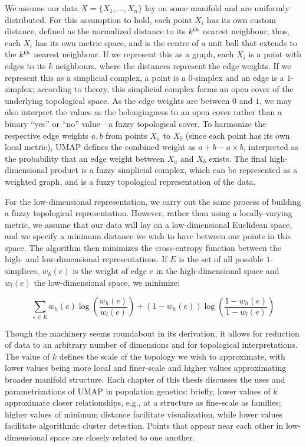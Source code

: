 We assume our data $X = \{X_{1}, \dots, X_{n}\}$ lay on some manifold and are uniformly distributed. For this assumption to hold, each point $X_{i}$ has its own custom distance, defined as the normalized distance to its $k\textsuperscript{th}$ nearest neighbour; thus, each $X_{i}$ has its own metric space, and is the centre of a unit ball that extends to the $k\textsuperscript{th}$ nearest neighbour. If we represent this as a graph, each $X_i$ is a point with edges to its $k$ neighbours, where the distances represent the edge weights. If we represent this as a simplicial complex, a point is a $0$-simplex and an edge is a $1$-simplex; according to theory, this simplicial complex forms an open cover of the underlying topological space. As the edge weights are between $0$ and $1$, we may also interpret the values as the belongingness to an open cover rather than a binary ``yes'' or ``no'' value---a fuzzy topological cover. To harmonize the respective edge weights $a, b$ from points $X_{a}$ to $X_{b}$ (since each point has its own local metric), UMAP defines the combined weight as $a + b - a \times b$, interpreted as the probability that an edge weight between $X_{a}$ and $X_{b}$ exists. The final high-dimensional product is a fuzzy simplicial complex, which can be represented as a weighted graph, and is a fuzzy topological representation of the data.

For the low-dimensional representation, we carry out the same process of building a fuzzy topological representation. However, rather than using a locally-varying metric, we assume that our data will lay on a low-dimensional Euclidean space, and we specify a minimum distance we wish to have between our points in this space. The algorithm then minimizes the cross-entropy function between the high- and low-dimensional representations. If $E$ is the set of all possible $1$-simplices, $w_{h}(e)$ is the weight of edge $e$ in the high-dimensional space and $w_{l}(e)$ the low-dimensional space, we minimize:

$$ \sum_{e \in E} w_{h}(e) \log{\left(\frac{w_{h}(e)}{w_{l}(e)}\right)} + (1 - w_{h}(e)) \log{\left(\frac{1 - w_{h}(e)}{1 - w_{l}(e)}\right)} $$

Though the machinery seems roundabout in its derivation, it allows for reduction of data to an arbitrary number of dimensions and for topological interpretations. The value of $k$ defines the scale of the topology we wish to approximate, with lower values being more local and finer-scale and higher values approximating broader manifold structure. Each chapter of this thesis discusses the uses and parametrizations of UMAP in population genetics: briefly, lower values of $k$ approximate closer relationships, e.g., at a structure as fine-scale as families; higher values of minimum distance facilitate visualization, while lower values facilitate algorithmic cluster detection. Points that appear near each other in low-dimensional space are closely related to one another.

